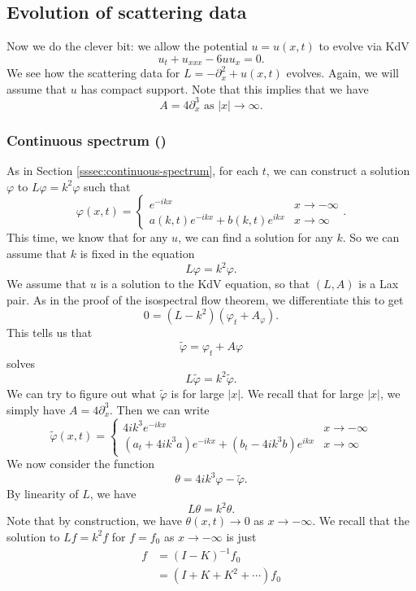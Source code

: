 \documentclass[a4paper]{article}
\begin{document}
\subsection{Evolution of scattering data}
Now we do the clever bit: we allow the potential $u = u(x, t)$ to evolve via KdV
\[
  u_t + u_{xxx} - 6 u u_x = 0.
\]
We see how the scattering data for $L = -\partial_x^2 + u(x, t)$ evolves. Again, we will assume that $u$ has compact support. Note that this implies that we have
\[
  A = 4 \partial_x^3\text{ as }|x| \to \infty.
\]
\subsubsection{Continuous spectrum ()}
As in Section \ref{sssec:continuous-spectrum}, for each $t$, we can construct a solution $\varphi$ to $L \varphi = k^2 \varphi$ such that
\[
  \varphi(x, t) =
  \begin{cases}
    e^{-ikx} & x \to -\infty\\
    a(k, t) e^{-ikx} + b(k, t) e^{ikx} & x \to \infty
  \end{cases}.
\]
This time, we know that for any $u$, we can find a solution for any $k$. So we can assume that $k$ is fixed in the equation
\[
  L\varphi = k^2 \varphi.
\]
We assume that $u$ is a solution to the KdV equation, so that $(L, A)$ is a Lax pair. As in the proof of the isospectral flow theorem, we differentiate this to get
\[
  0 = (L - k^2)(\varphi_t + A_\varphi).
\]
This tells us that
\[
  \tilde{\varphi} = \varphi_t + A \varphi
\]
solves
\[
  L \tilde{\varphi} = k^2 \tilde{\varphi}.
\]
We can try to figure out what $\tilde{\varphi}$ is for large $|x|$. We recall that for large $|x|$, we simply have $A = 4 \partial_x^3$. Then we can write
\[
  \tilde{\varphi}(x, t) =
  \begin{cases}
    4 ik^3 e^{-ikx} & x \to -\infty\\
    (a_t + 4 ik^3 a)e^{-ikx} + (b_t - 4ik^3 b) e^{ikx} & x \to \infty
  \end{cases}
\]
We now consider the function
\[
  \theta = 4ik^3 \varphi - \tilde{\varphi}.
\]
By linearity of $L$, we have
\[
  L \theta = k^2 \theta.
\]
Note that by construction, we have $\theta(x, t) \to 0$ as $x \to -\infty$. We recall that the solution to $Lf = k^2 f$ for $f = f_0$ as $x \to -\infty$ is just
\begin{align*}
  f &= (I - K)^{-1} f_0\\
  &= (I + K + K^2 + \cdots)f_0
\end{align*}
\end{document}
